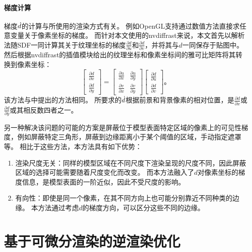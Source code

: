 \paragraph{梯度计算}
梯度$\dot d$的计算与所使用的渲染方式有关。
例如OpenGL支持通过数值方法直接求任意变量关于像素坐标的梯度\citep{opengl_dfdx}。
而针对本文使用的nvdiffrast来说，本文首先以解析法随SDF一同计算其关于纹理坐标的梯度$\frac{\partial d}{\partial u}$和$\frac{\partial d}{\partial v}$，并将其与$d$一同保存于贴图中。
然后根据nvdiffrast的插值模块给出的纹理坐标和像素坐标间的雅可比矩阵将其转换到像素坐标：
\begin{equation}
    \begin{bmatrix}
        \frac{\partial d}{\partial x} \\
        \frac{\partial d}{\partial y}
    \end{bmatrix} = \begin{bmatrix}
        \frac{\partial u}{\partial x} & \frac{\partial u}{\partial y} \\
        \frac{\partial v}{\partial x} & \frac{\partial v}{\partial y}
    \end{bmatrix} \begin{bmatrix}
        \frac{\partial d}{\partial u} \\
        \frac{\partial d}{\partial v}
    \end{bmatrix}
\text{。}
\end{equation}
该方法与\citet{sdf_glyphs}中提出的方法相同。
所要求的$\dot d$根据前景和背景像素的相对位置，是$\frac{\partial d}{\partial x}$或$\frac{\partial d}{\partial y}$或其相反数四者之一。

另一种解决该问题的可能的方案是屏蔽位于模型表面特定区域的像素上的可见性梯度，例如屏蔽特定三角形，屏蔽到边缘距离小于某个阈值的区域，手动指定遮罩等。
相比于这些方法，本方法具有如下优势：
\begin{enumerate}
\item 渲染尺度无关：同样的模型区域在不同尺度下渲染呈现的尺度不同，因此屏蔽区域的选择可能需要随着尺度变化而改变。
而本方法融入了$d$对像素坐标的梯度信息，是模型表面的一阶近似，因此不受尺度的影响。
\item 有向性：即使是同一个像素，在其不同方向上也可能分别靠近不同种类的边缘。
本方法通过考虑$d$的梯度方向，可以区分这些不同的边缘。
\end{enumerate}

\section{基于可微分渲染的逆渲染优化}

